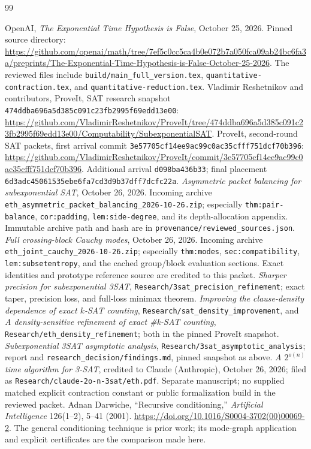 \documentclass[11pt]{article}
\theoremstyle{definition}\newtheorem{definition}[theorem]{Definition}
\theoremstyle{remark}\newtheorem{remark}[theorem]{Remark}
\newcommand{\sourcepin}{\texttt{474ddba696a5d385c091c23fb2995f69edd13e00}}
\begin{document}
\begin{thebibliography}{99}
\small
\setlength{\itemsep}{3pt}
\raggedright
{} OpenAI, \emph{The Exponential Time Hypothesis is False},
October 25, 2026. Pinned source directory:
\url{https://github.com/openai/math/tree/7ef5c0cc5ca4b0e072b7a050fca09ab24bc6fa3a/preprints/The-Exponential-Time-Hypothesis-is-False-October-25-2026}.
The reviewed files include \texttt{build/main\_full\_version.tex},
\texttt{quantitative-contraction.tex}, and \texttt{quantitative-reduction.tex}.
 Vladimir Reshetnikov and contributors, ProveIt, SAT research
snapshot \sourcepin:
\url{https://github.com/VladimirReshetnikov/ProveIt/tree/474ddba696a5d385c091c23fb2995f69edd13e00/Computability/SubexponentialSAT}.
 ProveIt, second-round SAT packets, first arrival commit
\texttt{3e57705cf14ee9ac99c0ac35cfff751dcf70b396}:
\url{https://github.com/VladimirReshetnikov/ProveIt/commit/3e57705cf14ee9ac99c0ac35cfff751dcf70b396}.
Additional arrival \texttt{d098ba436b33}; final placement
\texttt{6d3adc45061535ebe6fa7cd3d9b37dff7dcfc22a}.
 \emph{Asymmetric packet balancing for subexponential SAT},
October 26, 2026. Incoming archive
\texttt{eth\_asymmetric\_packet\_balancing\_2026-10-26.zip}; especially
\texttt{thm:pair-balance}, \texttt{cor:padding}, \texttt{lem:side-degree},
and its depth-allocation appendix. Immutable archive path and hash are in
\texttt{provenance/reviewed\_sources.json}.
 \emph{Full crossing-block Cauchy modes}, October 26, 2026.
Incoming archive \texttt{eth\_joint\_cauchy\_2026-10-26.zip}; especially
\texttt{thm:modes}, \texttt{sec:compatibility}, \texttt{lem:subsetentropy},
and the cached group/block evaluation sections. Exact identities and prototype
reference source are credited to this packet.
 \emph{Sharper precision for subexponential 3SAT},
\texttt{Research/3sat\_precision\_refinement}; exact taper, precision loss,
and full-loss minimax theorem.
 \emph{Improving the clause-density dependence of exact
$k$-SAT counting}, \texttt{Research/sat\_density\_improvement}, and
\emph{A density-sensitive refinement of exact \#k-SAT counting},
\texttt{Research/eth\_density\_refinement}; both in the pinned ProveIt snapshot.
 \emph{Subexponential 3SAT asymptotic analysis},
\texttt{Research/3sat\_asymptotic\_analysis}; report and
\texttt{research\_decision/findings.md}, pinned snapshot as above.
 \emph{A $2^{o(n)}$ time algorithm for 3-SAT}, credited to
Claude (Anthropic), October 26, 2026; filed as
\texttt{Research/claude-2o-n-3sat/eth.pdf}. Separate manuscript; no supplied
matched explicit contraction constant or public formalization build in the
reviewed packet.
 Adnan Darwiche, ``Recursive conditioning,''
\emph{Artificial Intelligence} 126(1--2), 5--41 (2001).
\url{https://doi.org/10.1016/S0004-3702(00)00069-2}.
The general conditioning technique is prior work; its mode-graph
application and explicit certificates are the comparison made here.
\end{thebibliography}
\end{document}
